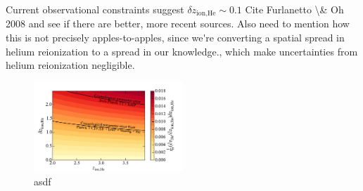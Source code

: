 \documentclass[twocolumn,aps,prd,nofootinbib,showpacs]{revtex4-1}
\begin{document}
Current observational constraints suggest $ \delta z_\textrm{ion,He} \sim 0.1$ \acl{Cite Furlanetto \& Oh 2008 and see if there are better, more recent sources. Also need to mention how this is not precisely apples-to-apples, since we're converting a spatial spread in helium reionization to a spread in our knowledge.}, which make uncertainties from helium reionization negligible.

\begin{figure}[!]
	\centering
	\includegraphics[width=0.5\textwidth,trim=0.5cm 0cm 0.75cm 0.90cm,clip]{figures/HeII_reion.pdf}
	\caption{asdf}
	\label{fig:HeII_reion_errors}
\end{figure}
\end{document}
